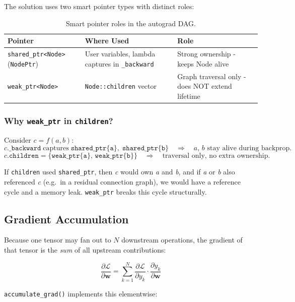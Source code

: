\documentclass[12pt, a4paper]{article}
\begin{document}
The solution uses two smart pointer types with distinct roles:

\begin{table}[!ht]
\centering
\renewcommand{\arraystretch}{1.35}
\begin{tabularx}{\textwidth}{@{} l l L @{}}
\toprule
\textbf{Pointer} & \textbf{Where Used} & \textbf{Role} \\
\midrule
\texttt{shared\_ptr<Node>} (\texttt{NodePtr})
  & User variables, lambda captures in \texttt{\_backward}
  & Strong ownership - keeps Node alive \\
\texttt{weak\_ptr<Node>}
  & \texttt{Node::children} vector
  & Graph traversal only - does NOT extend lifetime \\
\bottomrule
\end{tabularx}
\caption{Smart pointer roles in the autograd DAG.}
\end{table}

\subsubsection{Why \texttt{weak\_ptr} in \texttt{children}?}

Consider \(c = f(a, b)\):
\[
  c\texttt{.\_backward} \;\text{captures}\; \texttt{shared\_ptr\{a\}},\;
  \texttt{shared\_ptr\{b\}}
  \quad\Rightarrow\quad a,\,b \text{ stay alive during backprop.}
\]
\[
  c\texttt{.children} = \{\texttt{weak\_ptr\{a\}},\, \texttt{weak\_ptr\{b\}}\}
  \quad\Rightarrow\quad \text{traversal only, no extra ownership.}
\]

If \texttt{children} used \texttt{shared\_ptr}, then \textit{c} would own
\textit{a} and \textit{b}, and if \textit{a} or \textit{b} also referenced
\textit{c} (e.g.\ in a residual connection graph), we would have a reference
cycle and a memory leak.  \texttt{weak\_ptr} breaks this cycle structurally.

\subsection{Gradient Accumulation}

Because one tensor may fan out to \(N\) downstream operations, the gradient
of that tensor is the \emph{sum} of all upstream contributions:

\[
  \frac{\partial \mathcal{L}}{\partial \mathbf{w}}
  = \sum_{k=1}^{N}
    \frac{\partial \mathcal{L}}{\partial y_k}
    \cdot
    \frac{\partial y_k}{\partial \mathbf{w}}
\]

\texttt{accumulate\_grad()} implements this elementwise:
\end{document}
